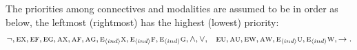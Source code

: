 \documentclass[twoside,11pt]{article}
\begin{document}

The priorities among connectives and modalities are assumed to be in order as below, the leftmost (rightmost) has the highest (lowest) priority:
 \begin{align*}
    & \neg, \textsc{e}\textsc{x}, \textsc{e}\textsc{f}, \textsc{e}\textsc{g}, \textsc{a}\textsc{x}, \textsc{a}\textsc{f}, \textsc{a}\textsc{g}, \textsc{e}_{{\langle{ind}\rangle}}\textsc{x}, \textsc{e}_{{\langle{ind}\rangle}}\textsc{f}, \textsc{e}_{{\langle{ind}\rangle}}\textsc{g}
	,\land, \lor,
	& \textsc{e}\textsc{u}, \textsc{a}\textsc{u}, \textsc{e} \textsc{w}, \textsc{a}\textsc{w}, \textsc{e}_{{\langle{ind}\rangle}}\textsc{u}, \textsc{e}_{{\langle{ind}\rangle}} \textsc{w}, \rightarrow.
\end{align*}


\end{document}
